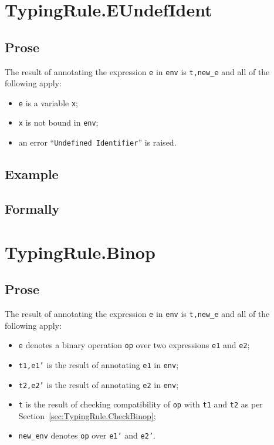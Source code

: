 \documentclass{book}
\begin{document}
\begin{itemize}
\section{TypingRule.EUndefIdent \label{sec:TypingRule.EUndefIdent}}

  \subsection{Prose}
  The result of annotating the expression \texttt{e} in \texttt{env} is
\texttt{t,new\_e} and all of the following apply:
  \begin{itemize}
  \item \texttt{e} is a variable \texttt{x};
  \item \texttt{x} is not bound in \texttt{env};
  \item an error ``\texttt{Undefined Identifier}'' is raised.
  \end{itemize}

  \subsection{Example}



\begin{emptyformal}
  \subsection{Formally}
\end{emptyformal}


\section{TypingRule.Binop \label{sec:TypingRule.Binop}}

  \subsection{Prose}
  The result of annotating the expression \texttt{e} in \texttt{env} is
\texttt{t,new\_e} and all of the following apply:
  \begin{itemize}
  \item \texttt{e} denotes a binary operation \texttt{op} over two expressions \texttt{e1} and \texttt{e2};
  \item \texttt{t1,e1'} is the result of annotating \texttt{e1} in \texttt{env};
  \item \texttt{t2,e2'} is the result of annotating \texttt{e2} in \texttt{env};
  \item \texttt{t} is the result of checking compatibility of \texttt{op} with \texttt{t1} and \texttt{t2} as per Section~\ref{sec:TypingRule.CheckBinop};
  \item \texttt{new\_env} denotes \texttt{op} over \texttt{e1'} and \texttt{e2'}.
  \end{itemize}


\end{itemize}
\end{document}
